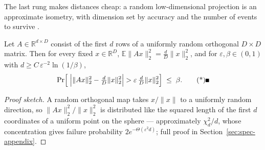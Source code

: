 The last rung makes distances cheap: a random low-dimensional projection is
an approximate isometry, with dimension set by accuracy and the number of
events to survive \citep{spectral-matrix-bg3,spectral-matrix-bg4}.

\begin{theorem}\label{thm:spec-jl}
Let $A \in \mathbb{R}^{d \times D}$ consist of the first $d$ rows of a
uniformly random orthogonal $D \times D$ matrix. Then for every fixed $x \in
\mathbb{R}^D$, $\mathbb{E}\|Ax\|_2^2 = \tfrac{d}{D}\|x\|_2^2$, and for
$\varepsilon, \beta \in (0,1)$ with $d \ge C\,\varepsilon^{-2}\ln(1/\beta)$,
\[
\Pr\Bigl[\;\Bigl|\|Ax\|_2^2 - \tfrac{d}{D}\|x\|_2^2\Bigr| >
\varepsilon\,\tfrac{d}{D}\|x\|_2^2\Bigr] \;\le\; \beta. \eopm
\]
\end{theorem}

\begin{proof}[Proof sketch]
A random orthogonal map takes $x/\|x\|$ to a uniformly random direction, so
$\|Ax\|_2^2/\|x\|_2^2$ is distributed like the squared length of the first $d$
coordinates of a uniform point on the sphere --- approximately $\chi^2_d/d$,
whose concentration gives failure probability $2e^{-\Theta(\varepsilon^2 d)}$;
full proof in Section~\ref{sec:spec-appendix}.
\end{proof}

\begin{widefigure}[t]
\centering
{}
\caption{Reading a spectrum: distance from $0$ certifies invertibility; a
spectral radius below $1$ licenses a Neumann expansion; a large eigengap
$\Delta$ fixes rates and subspace stability.}
\label{fig:spec-spectrum}
\end{widefigure}

